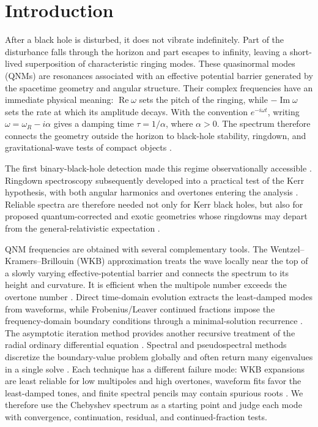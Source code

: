 \documentclass[12pt,a4paper]{article}
\begin{document}
\section{Introduction}

\color{blue}
After a black hole is disturbed, it does not vibrate indefinitely.  Part of
the disturbance falls through the horizon and part escapes to infinity,
leaving a short-lived superposition of characteristic ringing modes.  These
quasinormal modes (QNMs) are resonances associated with an effective potential
barrier generated by the spacetime geometry and angular structure.  Their
complex frequencies have an immediate physical meaning:
\(\operatorname{Re}\omega\) sets the pitch of the ringing, while
\(-\operatorname{Im}\omega\) sets the rate at which its amplitude decays.
With the convention \(e^{-i\omega t}\), writing
\(\omega=\omega_R-i\alpha\) gives a damping time
\(\tau=1/\alpha\), where \(\alpha>0\).
The spectrum therefore connects the geometry outside the horizon to black-hole
stability, ringdown, and gravitational-wave tests of compact objects
\cite{Vishveshwara1970,Kokkotas1999,Berti2009,Konoplya2011}.
\color{black}

\color{blue}
The first binary-black-hole detection made this regime observationally
accessible \cite{Abbott2016Observation}. Ringdown spectroscopy subsequently
developed into a practical test of the Kerr hypothesis, with both angular
harmonics and overtones entering the analysis \cite{Berti2006,Berti2009,Isi2019}.
Reliable spectra are therefore needed not only for Kerr black holes, but also
for proposed quantum-corrected and exotic geometries whose ringdowns may depart
from the general-relativistic expectation \cite{Konoplya2011,Jaramillo2021}.
\color{black}

\color{blue}
QNM frequencies are obtained with several complementary tools.  The
Wentzel--Kramers--Brillouin (WKB) approximation treats the wave locally near
the top of a slowly varying effective-potential barrier and connects the
spectrum to its height and curvature.  It is efficient when the multipole number exceeds
the overtone number \cite{Schutz1985,Iyer1987,Ferrari1984,Konoplya2003,Konoplya2011}. Direct
time-domain evolution extracts the least-damped modes from waveforms, while
Frobenius/Leaver continued fractions impose the frequency-domain boundary
conditions through a minimal-solution recurrence \cite{Leaver1985,Nollert1993}. The
asymptotic iteration method provides another recursive treatment of the radial
ordinary differential equation \cite{Cho2010}.  Spectral and pseudospectral
methods discretize the boundary-value problem globally and often return many
eigenvalues in a single solve \cite{Jansen2017}. Each technique has a different
failure mode: WKB expansions are least reliable for low multipoles and high
overtones, waveform fits favor the least-damped tones, and finite spectral
pencils may contain spurious roots \cite{Konoplya2003,Konoplya2011,Jansen2017}.
We therefore use the Chebyshev spectrum as a starting point and judge each mode
with convergence, continuation, residual, and continued-fraction tests.
\color{black}
\end{document}
